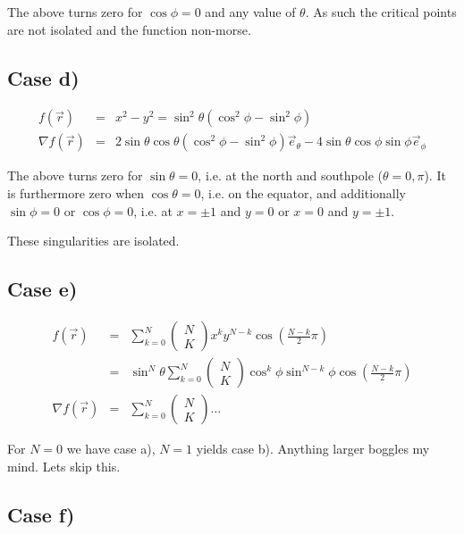 \documentclass[a4paper,10pt,notitlepage]{scrartcl}
\begin{document}
The above turns zero for $\cos\phi = 0$ and any value of $\theta$. As such the
critical points are not isolated and the function non-morse.

\subsection{Case d)}

\begin{eqnarray}
 f(\vec{r}) &=& x^2 - y^2 = \sin^2 \theta( \cos^2 \phi  - \sin^2 \phi) \\
 \nabla f(\vec{r}) &=& 2 \sin \theta \cos \theta (\cos^2 \phi - \sin^2 \phi)
\vec{e}_\theta -
4 \sin \theta \cos\phi \sin\phi \vec{e}_\phi
\end{eqnarray}

The above turns zero for $\sin\theta = 0$, i.e. at the north and
southpole ($\theta = 0, \pi$). It is furthermore zero when $\cos \theta = 0$,
i.e. on the equator, and additionally $\sin \phi = 0$ or $\cos \phi = 0$, i.e.
at $x = \pm 1$ and $y = 0$ or $x = 0$ and $y = \pm 1$.

These singularities are isolated.

\subsection{Case e)}

\begin{eqnarray}
 f(\vec{r}) &=& \sum^N_{k = 0} { \left(\begin{array}{c} N \\ K \end{array}
\right) x^k y^{N-k} \cos \left(\frac{N-k}{2} \pi\right) } \\
  &=& \sin^N \theta \sum^N_{k = 0} { \left(\begin{array}{c} N \\ K \end{array}
\right) \cos^{k}\phi \sin^{N-k} \phi \cos \left(\frac{N-k}{2} \pi\right) } \\
 \nabla f(\vec{r}) &=& \sum^N_{k = 0} { \left(\begin{array}{c} N \\ K
\end{array} \right) \dots }
\end{eqnarray}

For $N = 0$ we have case a), $N = 1$ yields case b). Anything larger boggles my
mind. Lets skip this.

\subsection{Case f)}
\end{document}

